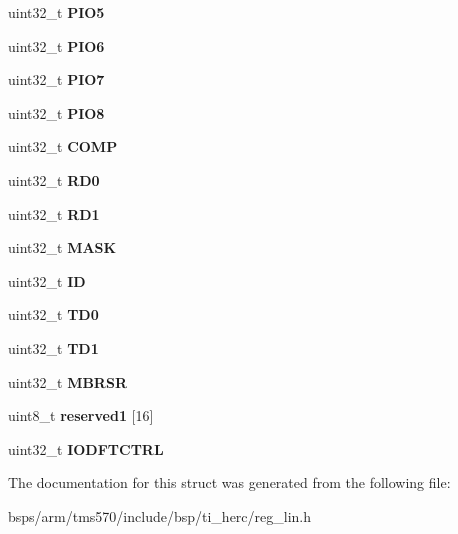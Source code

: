 \begin{DoxyCompactItemize}
uint32\+\_\+t {\bfseries P\+I\+O5}
\item 
\mbox{\label{structtms570__lin__t_a0931851a4d0a416e5806e4baadc77f2e}} 
uint32\+\_\+t {\bfseries P\+I\+O6}
\item 
\mbox{\label{structtms570__lin__t_aaf08dcc420a665856529fb4ec4fd688e}} 
uint32\+\_\+t {\bfseries P\+I\+O7}
\item 
\mbox{\label{structtms570__lin__t_ab46cdf56022d311960bc30b6f0b83971}} 
uint32\+\_\+t {\bfseries P\+I\+O8}
\item 
\mbox{\label{structtms570__lin__t_aba67096bf1a26137c81784f7ea80b288}} 
uint32\+\_\+t {\bfseries C\+O\+MP}
\item 
\mbox{\label{structtms570__lin__t_ad3d16acd6e257aed3ab63b2af04301de}} 
uint32\+\_\+t {\bfseries R\+D0}
\item 
\mbox{\label{structtms570__lin__t_ab10fe5c3e0a009d997355b1418e86986}} 
uint32\+\_\+t {\bfseries R\+D1}
\item 
\mbox{\label{structtms570__lin__t_a7ec4487df6fe060d4e438c35da2971b4}} 
uint32\+\_\+t {\bfseries M\+A\+SK}
\item 
\mbox{\label{structtms570__lin__t_a734eb262d84e72d41140fe82d72776ed}} 
uint32\+\_\+t {\bfseries ID}
\item 
\mbox{\label{structtms570__lin__t_ae947532d8d105f6108bafbd182644ff5}} 
uint32\+\_\+t {\bfseries T\+D0}
\item 
\mbox{\label{structtms570__lin__t_abddde616dfe25aeb38470ce2731d3a0b}} 
uint32\+\_\+t {\bfseries T\+D1}
\item 
\mbox{\label{structtms570__lin__t_ad21ca147474d90fe25ea99dc8f6fb129}} 
uint32\+\_\+t {\bfseries M\+B\+R\+SR}
\item 
\mbox{\label{structtms570__lin__t_a35ae3a62e7e49b9f702627746eb4eb0c}} 
uint8\+\_\+t {\bfseries reserved1} \mbox{[}16\mbox{]}
\item 
\mbox{\label{structtms570__lin__t_ac1456c5a0355ce50a47737ff57cb7d24}} 
uint32\+\_\+t {\bfseries I\+O\+D\+F\+T\+C\+T\+RL}
\end{DoxyCompactItemize}


The documentation for this struct was generated from the following file\+:\begin{DoxyCompactItemize}
\item 
bsps/arm/tms570/include/bsp/ti\+\_\+herc/reg\+\_\+lin.\+h\end{DoxyCompactItemize}
